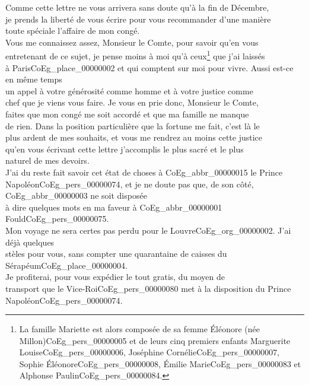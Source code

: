 \documentclass{book}
\begin{document}
Comme cette lettre ne vous arrivera sans doute qu’à la fin de Décembre,\\
je prends la liberté de vous écrire pour vous recommander d’une manière\\
toute spéciale l’affaire de mon congé.\\
\indent Vous me connaissez assez, Monsieur le Comte, pour savoir qu’en vous\\
entretenant de ce sujet, je pense moins à moi qu’à ceux\footnote{La famille Mariette est alors composée de sa femme Éléonore (née Millon)\gls{CoEg_pers_00000005} et de leurs cinq premiers enfants Marguerite Louise\gls{CoEg_pers_00000006}, Joséphine Cornélie\gls{CoEg_pers_00000007}, Sophie Éléonore\gls{CoEg_pers_00000008}, Émilie Marie\gls{CoEg_pers_00000083} et Alphonse Paulin\gls{CoEg_pers_00000084}.} que j’ai laissés\\
à Paris\gls{CoEg_place_00000002} et qui comptent sur moi pour vivre. Aussi est-ce en même temps\\
un appel à votre générosité comme homme et à votre justice comme\\
chef que je viens vous faire. Je vous en prie donc, Monsieur le Comte,\\
faites que mon congé me soit accordé et que ma famille ne manque\\
de rien. Dans la position particulière que la fortune me fait, c’est là le\\
plus ardent de mes souhaits, et vous me rendrez au moins cette justice\\
qu’en vous écrivant cette lettre j’accomplis le plus sacré et le plus\\
naturel de mes devoirs.\\
\indent J’ai du reste fait savoir cet état de choses à \gls{CoEg_abbr_00000015} le Prince\\
Napoléon\gls{CoEg_pers_00000074}, et je ne doute pas que, de son côté, \gls{CoEg_abbr_00000003} ne soit disposée\\
à dire quelques mots en ma faveur à \gls{CoEg_abbr_00000001} Fould\gls{CoEg_pers_00000075}.\\
\indent Mon voyage ne sera certes pas perdu pour le Louvre\gls{CoEg_org_00000002}. J’ai déjà quelques\\
stèles pour vous, sans compter une quarantaine de caisses du Sérapéum\gls{CoEg_place_00000004}.\\
Je profiterai, pour vous expédier le tout gratis, du moyen de\\
transport que le Vice-Roi\gls{CoEg_pers_00000080} met à la disposition du Prince Napoléon\gls{CoEg_pers_00000074}.\\
\end{document}
